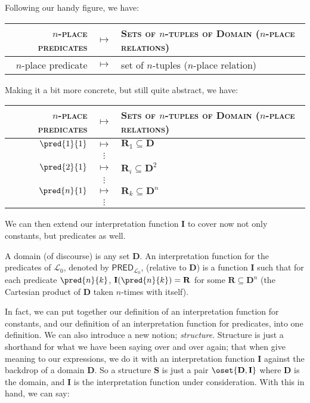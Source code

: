 Following our handy figure, we have:

\begin{center}
	\begin{tabular}{rcl}
		$n$-\textsc{place predicates} & $\mapsto$ & \textsc{Sets of $n$-tuples of Domain ($n$-place relations)}\\\hline
		$n$-place predicate & $\mapsto$ & set of $n$-tuples ($n$-place relation)
	\end{tabular}
\end{center} 

Making it a bit more concrete, but still quite abstract, we have: 

\begin{center}
	\begin{tabular}{rcl}
		$n$-\textsc{place predicates} & $\mapsto$ & \textsc{Sets of $n$-tuples of Domain ($n$-place relations)}\\\hline
		$\pred{1}{1}$ & $\mapsto$ & $\mathbf{R}_1 \subseteq \mathbf{D}$\\
		& $\vdots$ &\\
		$\pred{2}{1}$ & $\mapsto$ & $\mathbf{R}_i \subseteq \mathbf{D}^2$\\
		& $\vdots$ &\\
		$\pred{n}{1}$ & $\mapsto$ & $\mathbf{R}_k \subseteq \mathbf{D}^n$\\
		& $\vdots$ &\\
	\end{tabular}
\end{center} 

We can then extend our interpretation function $\mathbf{I}$ to cover now not only constants, but predicates as well. 

\begin{defn}
A domain (of discourse) is any set $\mathbf{D}$. An interpretation function for the predicates of $\mathcal{L}_0$, denoted by $\mathsf{PRED}_{\mathcal{L}_0}$, (relative to $\mathbf{D}$) is a function $\mathbf{I}$ such that for each predicate $\pred{n}{k}$, $\mathbf{I}(\pred{n}{k})=\mathbf{R}$ for some $\mathbf{R} \subseteq \mathbf{D}^n$ (the Cartesian product of $\mathbf{D}$ taken $n$-times with itself). 
\end{defn}

In fact, we can put together our definition of an interpretation function for constants, and our definition of an interpretation function for predicates, into one definition. We can also introduce a new notion; \textit{structure}. Structure is just a shorthand for what we have been saying over and over again; that when give meaning to our expressions, we do it with an interpretation function $\mathbf{I}$ against the backdrop of a domain $\mathbf{D}$. So a structure $\mathbf{S}$ is just a pair $\oset{\mathbf{D}, \mathbf{I}}$ where $\mathbf{D}$ is the domain, and $\mathbf{I}$ is the interpretation function under consideration. With this in hand, we can say: 

